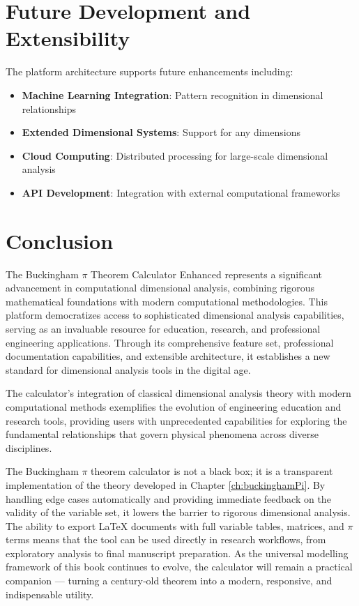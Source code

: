 \section{Future Development and Extensibility}
The platform architecture supports future enhancements including:
\begin{itemize}
    \item \textbf{Machine Learning Integration}: Pattern recognition in dimensional relationships
    \item \textbf{Extended Dimensional Systems}: Support for any dimensions
    \item \textbf{Cloud Computing}: Distributed processing for large-scale dimensional analysis
    \item \textbf{API Development}: Integration with external computational frameworks
\end{itemize}

\section{Conclusion}
The Buckingham $\pi$ Theorem Calculator Enhanced represents a significant advancement in computational dimensional analysis, combining rigorous mathematical foundations with modern computational methodologies. This platform democratizes access to sophisticated dimensional analysis capabilities, serving as an invaluable resource for education, research, and professional engineering applications. Through its comprehensive feature set, professional documentation capabilities, and extensible architecture, it establishes a new standard for dimensional analysis tools in the digital age.

The calculator's integration of classical dimensional analysis theory with modern computational methods exemplifies the evolution of engineering education and research tools, providing users with unprecedented capabilities for exploring the fundamental relationships that govern physical phenomena across diverse disciplines.


The Buckingham $\pi$ theorem calculator is not a black box; it is a transparent implementation of the theory developed in Chapter \ref{ch:buckinghamPi}. By handling edge cases automatically and providing immediate feedback on the validity of the variable set, it lowers the barrier to rigorous dimensional analysis. The ability to export LaTeX documents with full variable tables, matrices, and $\pi$ terms means that the tool can be used directly in research workflows, from exploratory analysis to final manuscript preparation. As the universal modelling framework of this book continues to evolve, the calculator will remain a practical companion — turning a century‑old theorem into a modern, responsive, and indispensable utility.

